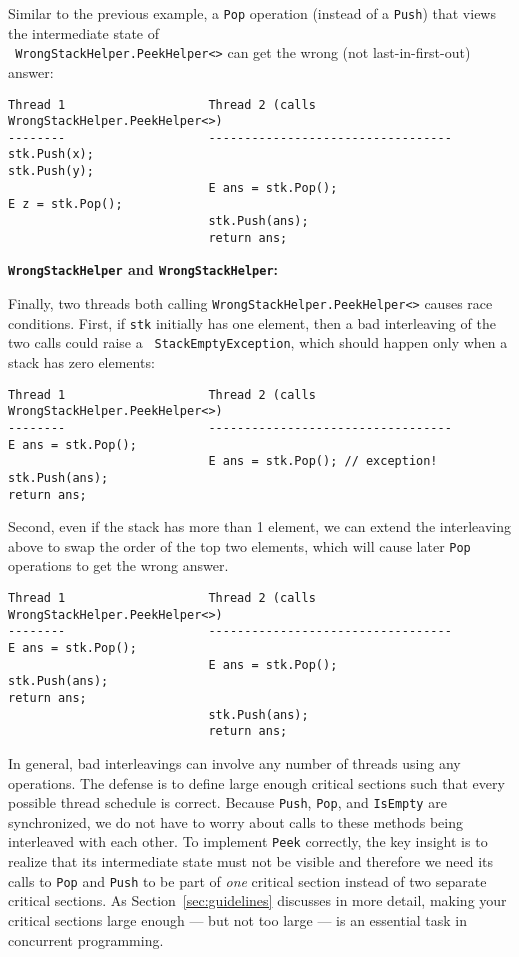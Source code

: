 \documentclass[10pt]{article}
\begin{document}
Similar to the previous example, a {\tt Pop} operation (instead of a
{\tt Push}) that views the intermediate state of\\ {\tt
  WrongStackHelper.PeekHelper<>} can get the wrong (not last-in-first-out) answer:
\begin{verbatim}
Thread 1                    Thread 2 (calls WrongStackHelper.PeekHelper<>)
--------                    ----------------------------------
stk.Push(x);
stk.Push(y);
                            E ans = stk.Pop();
E z = stk.Pop();
                            stk.Push(ans);
                            return ans;
\end{verbatim}

\medskip
\noindent\textbf{{\tt WrongStackHelper} and {\tt WrongStackHelper}:}
\medskip

Finally, two threads both calling {\tt WrongStackHelper.PeekHelper<>} causes race
conditions.  First, if {\tt stk} initially has one element, then
a bad interleaving of the two calls could raise a {\tt
  StackEmptyException}, which should happen only when a stack has zero
elements:
\begin{verbatim}
Thread 1                    Thread 2 (calls WrongStackHelper.PeekHelper<>)
--------                    ----------------------------------
E ans = stk.Pop();
                            E ans = stk.Pop(); // exception!
stk.Push(ans);
return ans;
\end{verbatim}
Second, even if the stack has more than 1 element, we can extend the
interleaving above to swap the order of the top two elements, which
will cause later {\tt Pop} operations to get the wrong answer.
\begin{verbatim}
Thread 1                    Thread 2 (calls WrongStackHelper.PeekHelper<>)
--------                    ----------------------------------
E ans = stk.Pop();
                            E ans = stk.Pop();
stk.Push(ans);
return ans;
                            stk.Push(ans);
                            return ans;
\end{verbatim}

\bigskip

In general, bad interleavings can involve any number of threads using
any operations.  The defense is to define large enough critical
sections such that every possible thread schedule is correct.  Because
{\tt Push}, {\tt Pop}, and {\tt IsEmpty} are synchronized, we do not
have to worry about calls to these methods being interleaved with each
other.  To implement {\tt Peek} correctly, the key insight is to
realize that its intermediate state must not be visible and therefore
we need its calls to {\tt Pop} and {\tt Push} to be part of \emph{one}
critical section instead of two separate critical sections.  As
Section~\ref{sec:guidelines} discusses in more detail, making your
critical sections large enough --- but not too large --- is an
essential task in concurrent programming.
\end{document}
